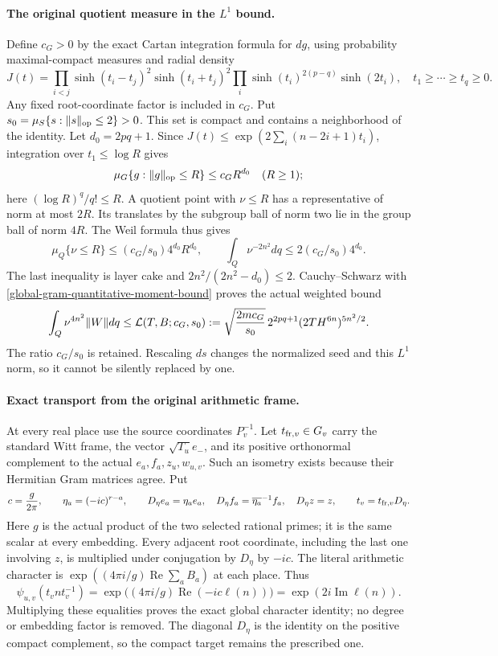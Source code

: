 \paragraph{The original quotient measure in the $L^1$ bound.}
Define $c_G>0$ by the exact Cartan integration formula for $dg$,
using probability maximal-compact measures and radial density
\[
 J(t)=\prod_{i<j}\sinh(t_i-t_j)^2\sinh(t_i+t_j)^2
       \prod_i\sinh(t_i)^{2(p-q)}\sinh(2t_i),
 \quad t_1\ge\cdots\ge t_q\ge0.
\]
Any fixed root-coordinate factor is included in $c_G$.
Put $s_0=\mu_S\{s:\|s\|_{\rm op}\le2\}>0$.
This set is compact and contains a neighborhood of the identity.
Let $d_0=2pq+1$.  Since
$J(t)\le\exp(2\sum_i(n-2i+1)t_i)$, integration over
$t_1\le\log R$ gives
\[
 \mu_G\{g:\|g\|_{\rm op}\le R\}\le c_G R^{d_0}
 \quad(R\ge1);
\]
here $(\log R)^q/q!\le R$.  A quotient point with $\nu\le R$
has a representative of norm at most $2R$.  Its translates by
the subgroup ball of norm two lie in the group ball of norm
$4R$.  The Weil formula thus gives
\[
 \mu_Q\{\nu\le R\}\le(c_G/s_0)4^{d_0}R^{d_0},\qquad
 \int_Q\nu^{-2n^2}dq\le2(c_G/s_0)4^{d_0}.
\]
The last inequality is layer cake and
$2n^2/(2n^2-d_0)\le2$.
Cauchy--Schwarz with
\eqref{global-gram-quantitative-moment-bound} proves the actual
weighted bound
\begin{equation}\label{global-gram-quantitative-L1}
 \int_Q\nu^{4n^2}\|W\|dq
 \le {\cal L}(T,B;c_G,s_0):=
 \sqrt{\frac{2m c_G}{s_0}}\,2^{2pq+1}
                    (2T H^{6n})^{5n^2/2}.
\end{equation}
The ratio $c_G/s_0$ is retained.  Rescaling $ds$ changes the
normalized seed and this $L^1$ norm, so it cannot be silently
replaced by one.

\paragraph{Exact transport from the original arithmetic frame.}
At every real place use the source coordinates $P_v^{-1}$.
Let $t_{{\rm fr},v}\in G_v$ carry the standard Witt frame, the
vector $\sqrt{T_u}e_-$, and its positive orthonormal complement
to the actual $e_a,f_a,z_u,w_{u,v}$.  Such an isometry exists
because their Hermitian Gram matrices agree.  Put
\begin{equation}\label{global-gram-quantitative-character-scale}
 c=\frac{g}{2\pi},\qquad
 \eta_a=(-ic)^{r-a},\qquad
 D_\eta e_a=\eta_a e_a,\quad
 D_\eta f_a=\overline{\eta_a}^{-1}f_a,\quad
 D_\eta z=z,\qquad t_v=t_{{\rm fr},v}D_\eta.
\end{equation}
Here $g$ is the actual product of the two selected rational
primes; it is the same scalar at every embedding.
Every adjacent root coordinate, including the last one involving
$z$, is multiplied under conjugation by $D_\eta$ by $-ic$.
The literal arithmetic character is
$\exp((4\pi i/g)\operatorname{Re}\sum_a B_a)$ at each place.
Thus
\[
 \psi_{u,v}(t_vnt_v^{-1})
 =\exp\bigl((4\pi i/g)\operatorname{Re}(-ic\ell(n))\bigr)
 =\exp(2i\operatorname{Im}\ell(n)).
\]
Multiplying these equalities proves the exact global character
identity; no degree or embedding factor is removed.
The diagonal $D_\eta$ is the identity on the positive compact
complement, so the compact target remains the prescribed one.

